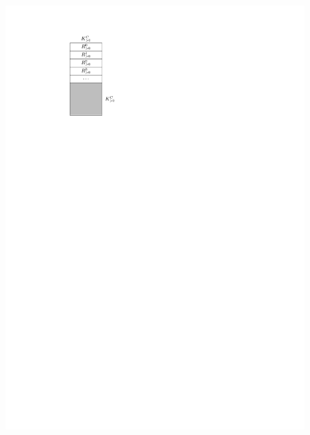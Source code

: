\documentclass{article}
\begin{document}
\begin{figure}
    \centering
    \includegraphics{figs/matrix-Rg0}
    \hspace{1in}

\end{figure}
\end{document}
